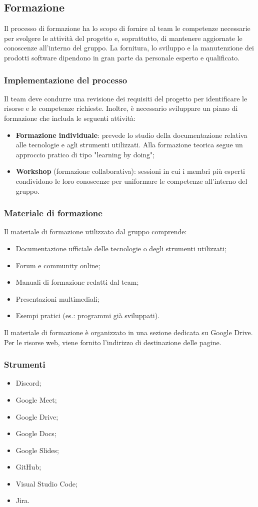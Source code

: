 \subsection{Formazione}
\par Il processo di formazione ha lo scopo di fornire al team le competenze necessarie per svolgere le attività del progetto e, soprattutto, di mantenere aggiornate le conoscenze all'interno del gruppo. La fornitura, lo sviluppo e la manutenzione dei prodotti software dipendono in gran parte da personale esperto e qualificato.

\subsubsection{Implementazione del processo}
\par Il team deve condurre una revisione dei requisiti del progetto per identificare le risorse e le competenze richieste. Inoltre, è necessario sviluppare un piano di formazione che includa le seguenti attività:
\begin{itemize}
  \item \textbf{Formazione individuale}: prevede lo studio della documentazione relativa alle tecnologie e agli strumenti utilizzati. Alla formazione teorica segue un approccio pratico di tipo "learning by doing";
  \item \textbf{Workshop} (formazione collaborativa): sessioni in cui i membri più esperti condividono le loro conoscenze per uniformare le competenze all'interno del gruppo.
\end{itemize}

\subsubsection{Materiale di formazione}
\par Il materiale di formazione utilizzato dal gruppo comprende:
\begin{itemize}
  \item Documentazione ufficiale delle tecnologie o degli strumenti utilizzati;
  \item Forum e community online;
  \item Manuali di formazione redatti dal team;
  \item Presentazioni multimediali;
  \item Esempi pratici (es.: programmi già sviluppati).
\end{itemize}

\vspace{0.5\baselineskip}
\par Il materiale di formazione è organizzato in una sezione dedicata su Google Drive. Per le risorse web, viene fornito l'indirizzo di destinazione delle pagine.

\subsubsection{Strumenti}
\begin{itemize}
  \item Discord;
  \item Google Meet;
  \item Google Drive;
  \item Google Docs;
  \item Google Slides;
  \item GitHub;
  \item Visual Studio Code;
  \item Jira.
\end{itemize}